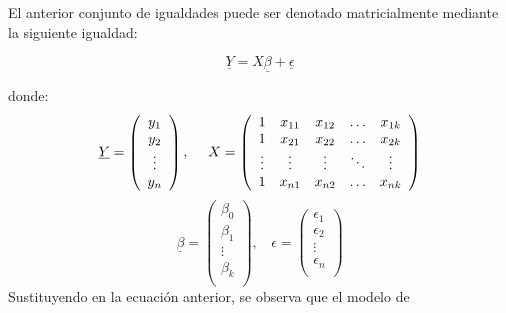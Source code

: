 \documentclass[a4paper,oneside,openany]{book}
\begin{document}
El anterior conjunto de igualdades puede ser denotado matricialmente
mediante la siguiente igualdad:

\[\underline{Y}=X\underline{\beta}+\underline{\epsilon}\]

donde: \[
\begin{equation*}
\underline{Y}=
\left(
\begin{array}{c}
y_{1} \\
y_{2} \\
\vdots \\
y_{n}\\
\end{array}
\right),\ \ \ \  X=
\left(
\begin{array}{c c c c c}
1      & x_{11} & x_{12} & \ldots & x_{1k}\\ 
1      & x_{21} & x_{22} & \ldots & x_{2k}\\
\vdots & \vdots & \vdots & \ddots & \vdots\\
1      & x_{n1} & x_{n2} & \ldots & x_{nk}\\
\end{array}
\right)
\end{equation*}
\] \[
\begin{equation*}
\underline{\beta}=
\left(
\begin{array}{c}
\beta_{0} \\
\beta_{1} \\
\vdots \\
\beta_{k}\\
\end{array}
\right),\ \ \ \  \epsilon=
\left(
\begin{array}{c}
\epsilon_{1} \\
\epsilon_{2} \\
\vdots \\
\epsilon_{n}\\
\end{array}
\right)
\end{equation*}
\] Sustituyendo en la ecuación anterior, se observa que el modelo de
\end{document}
